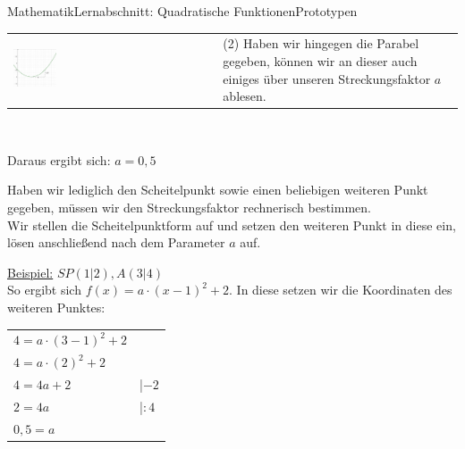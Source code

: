 \documentclass[11pt,twocolumn,oneside,openany,headings=optiontotoc,11pt,numbers=noenddot]{article}
\begin{document}
\begin{worksheet}{Mathematik}{Lernabschnitt: Quadratische Funktionen}{Prototypen}
\begin{tabularx}{0.5\textwidth}{XX}
			\includegraphics[width=0.22\textwidth, align=t]{../99_Bilder/a_graph.png} & (2) Haben wir hingegen die Parabel gegeben, können wir an dieser auch einiges über unseren Streckungsfaktor \(a\) ablesen.
		\end{tabularx}\\
		\par\noindent
		Daraus ergibt sich: \(a = 0,5\)\\
		\par\bigskip\noindent
		Haben wir lediglich den Scheitelpunkt sowie einen beliebigen weiteren Punkt gegeben, müssen wir den Streckungsfaktor rechnerisch bestimmen.\\
		Wir stellen die Scheitelpunktform auf und setzen den weiteren Punkt in diese ein, lösen anschließend nach dem Parameter \(a\) auf.\\
		\par\bigskip\noindent
		\underline{Beispiel:} \(SP(1|2), A(3|4)\)\\
		So ergibt sich \(f(x) = a\cdot(x-1)^2+2\). In diese setzen wir die Koordinaten des weiteren Punktes:\\
		\begin{tabularx}{0.5\textwidth}{ll}
			\(4 = a\cdot(3-1)^2 +2\)\\
			\(4 = a\cdot(2)^2 + 2\)\\
			\(4 = 4a +2\) & |\(-2\)\\
			\(2 = 4a\) & |\(:4\)\\
			\(0,5 = a\)
		\end{tabularx}

\end{worksheet}
\end{document}
